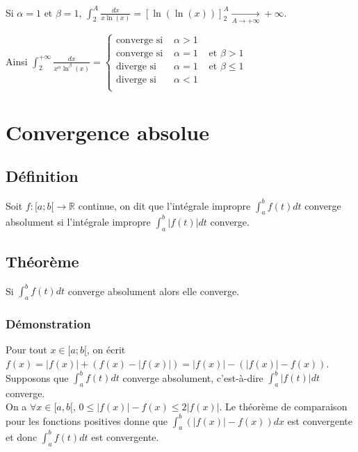 \documentclass[a4paper,10pt]{book} %
\newcommand{\R}{\mathbb{R}}
\newcommand{\abs}[1]{\left|#1\right|}
\newcommand{\displayAmath}{\displaystyle}
\begin{document}
\begin{enumerate}
Si $\alpha=1$ et $\beta=1$, $\displayAmath\int_2^A\frac{dx}{x\ln(x)}=[\ln(\ln(x))]_2^A \underset{A\rightarrow +\infty}{\rightarrow}+\infty$.\\\smallskip

Ainsi $\displayAmath\int_2^{+\infty} \frac{dx}{x^\alpha\ln^\beta(x)}=\left\{\begin{array}{rrl}
	\text{converge si }&\alpha>1 \\
	\text{converge si }&\alpha=1&\text{ et }\beta>1\\
	\text{diverge si }&\alpha=1&\text{ et }\beta\leq 1\\
	\text{diverge si }&\alpha<1\\
\end{array}\right.$
\end{enumerate}

\newpage

\section{Convergence absolue}
\subsection{Définition}
Soit $f:[a;b[\rightarrow \R$ continue, on dit que l'intégrale impropre $\displayAmath\int_a^bf(t)dt$ converge absolument si l'intégrale impropre $\displayAmath\int_a^b\abs{f(t)}dt$ converge.

\subsection{Théorème}
Si $\displayAmath\int_a^bf(t)dt$ converge absolument alors elle converge.

\subsubsection{Démonstration}
Pour tout $x \in[a;b[$, on écrit $f(x)=\abs{f(x)}+(f(x)-\abs{f(x)})=\abs{f(x)}-(\abs{f(x)}-f(x))$.\\

Supposons que $\displayAmath\int_a^bf(t)dt$ converge absolument, c'est-à-dire $\displayAmath\int_a^b\abs{f(t)}dt$ converge.\\

On a $\forall x\in[a,b[$, $0\leq \abs{f(x)}-f(x)\leq 2\abs{f(x)}$. 
Le théorème de comparaison pour les fonctions positives donne que $\displayAmath\int_a^b(\abs{f(x)}-f(x))dx$ est convergente et donc $\displayAmath\int_a^bf(t)dt$ est convergente.
\end{document}
